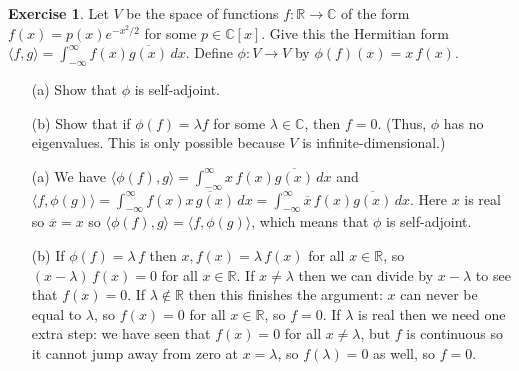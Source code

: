 \documentclass{amsart}
\newcommand{\R}         {{\mathbb{R}}}
\newcommand{\C}         {{\mathbb{C}}}
\newcommand{\lm}        {\lambda}
\newcommand{\ip}[1]     {\langle #1\rangle}
\newcommand{\ov}[1]     {\overline{#1}}
\renewcommand{\:}       {\colon}
\theoremstyle{definition}
\newtheorem{exercise}{Exercise}[section]
\renewenvironment{solution}{\SolutionAtEnd}{\endSolutionAtEnd}
\begin{document}
\begin{exercise}
 Let $V$ be the space of functions $f\:\R\to\C$ of the form
 $f(x)=p(x)e^{-x^2/2}$ for some $p\in\C[x]$.  Give this the Hermitian
 form $\ip{f,g}=\int_{-\infty}^\infty f(x)\ov{g(x)}\,dx$.  Define
 $\phi\:V\to V$ by $\phi(f)(x)=x\,f(x)$.
 \begin{itemize}
  \item[(a)] Show that $\phi$ is self-adjoint.
  \item[(b)] Show that if $\phi(f)=\lm f$ for some $\lm\in\C$, then
   $f=0$.  (Thus, $\phi$ has no eigenvalues.  This is only possible
   because $V$ is infinite-dimensional.)
 \end{itemize}
\end{exercise}
\begin{solution}
 \begin{itemize}
  \item[(a)] We have
   $\ip{\phi(f),g}=\int_{-\infty}^\infty x\,f(x)\ov{g(x)}\,dx$ and
   $\ip{f,\phi(g)}=\int_{-\infty}^\infty f(x)\ov{x\,g(x)}\,dx=
   \int_{-\infty}^\infty \ov{x}\,f(x)\ov{g(x)}\,dx$.  Here $x$ is real
   so $\ov{x}=x$ so $\ip{\phi(f),g}=\ip{f,\phi(g)}$, which means that
   $\phi$ is self-adjoint. 
  \item[(b)] If $\phi(f)=\lm\,f$ then $x,f(x)=\lm\,f(x)$ for all
   $x\in\R$, so $(x-\lm)\,f(x)=0$ for all $x\in\R$.  If $x\neq\lm$
   then we can divide by $x-\lm$ to see that $f(x)=0$.  If
   $\lm\not\in\R$ then this finishes the argument: $x$ can never be
   equal to $\lm$, so $f(x)=0$ for all $x\in\R$, so $f=0$.  If $\lm$
   is real then we need one extra step: we have seen that $f(x)=0$ for
   all $x\neq\lm$, but $f$ is continuous so it cannot jump away from
   zero at $x=\lm$, so $f(\lm)=0$ as well, so $f=0$.
 \end{itemize}
\end{solution}
\end{document}
